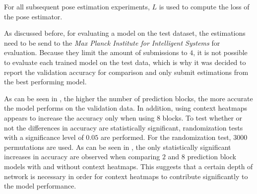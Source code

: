 For all subsequent pose estimation experiments, $L$ is used to compute the loss of the pose estimator.

As discussed before, for evaluating a model on the test dataset, the estimations need to be send to the \textit{Max Planck Institute for Intelligent Systems} for evaluation.
Because they limit the amount of submissions to $4$, it is not possible to evaluate each trained model on the test data, which is why it was decided to report the validation accuracy for comparison and only submit estimations from the best performing model.

As can be seen in , the higher the number of prediction blocks, the more accurate the model performs on the validation data.
In addition, using context heatmaps appears to increase the accuracy only when using $8$ blocks.
To test whether or not the differences in accuracy are statistically significant, randomization tests with a significance level of $0.05$ are performed.
For the randomization test, $3000$ permutations are used.
As can be seen in , the only statistically significant increases in accuracy are observed when comparing $2$ and $8$ prediction block models with and without context heatmaps.
This suggests that a certain depth of network is necessary in order for context heatmaps to contribute significantly to the model performance.
 

